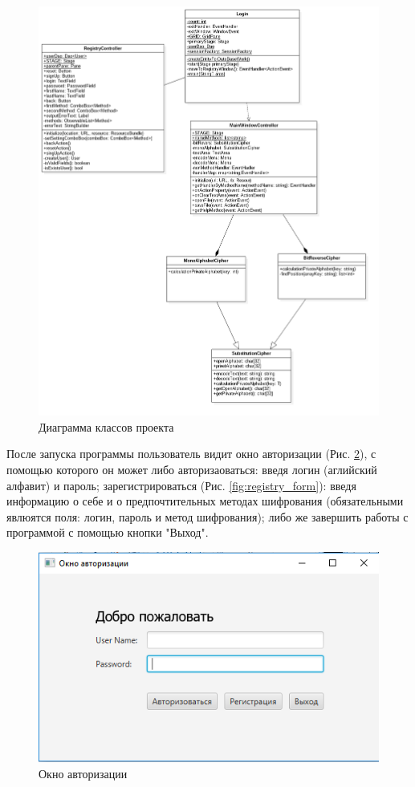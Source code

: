 \documentclass[a4paper,12pt]{article}
\begin{document}
\begin{center}
	\begin{figure}[h!]
		\centering
   		\includegraphics[scale=0.5]{img/class_diagram.png}
   		\caption{Диаграмма классов проекта}
   		\label{fig:class_diagram}
    \end{figure}
\end{center}
После запуска программы пользователь видит окно авторизации (Рис. \ref{fig:login_form}), с помощью которого он может либо авторизаоваться: введя логин (аглийский алфавит) и пароль; зарегистрироваться (Рис. \ref{fig:registry_form}): введя информацию о себе и о предпочтительных методах шифрования (обязательными явлюятся поля: логин, пароль и метод шифрования); либо же завершить работы с программой с помощью кнопки "Выход".
\begin{center}
	\begin{figure}[h!]
		\centering
   		\includegraphics[scale=0.5]{img/login_form.png}
   		\caption{Окно авторизации}
   		\label{fig:login_form}
    \end{figure}
\end{center}
\end{document}
